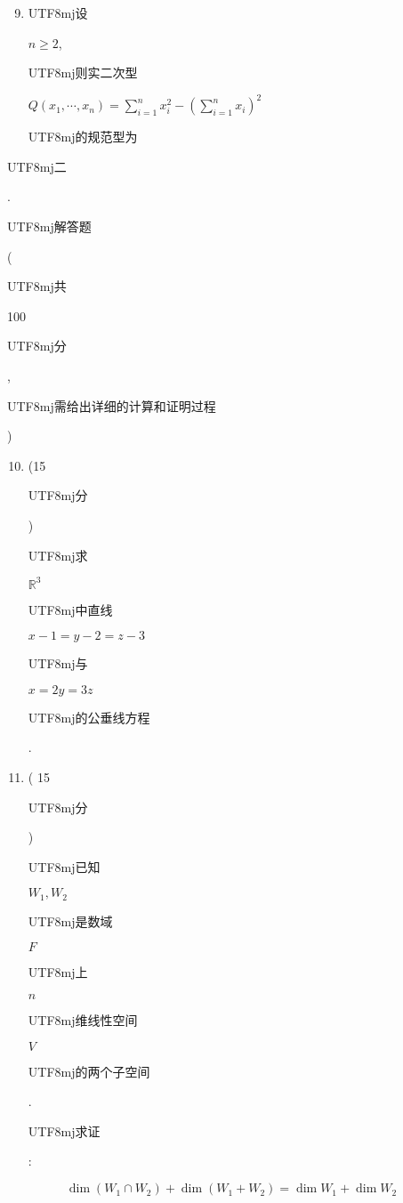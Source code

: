 \documentclass[10pt]{article}
\begin{document}
\begin{enumerate}
  \setcounter{enumi}{8}
  \item \begin{CJK}{UTF8}{mj}设\end{CJK} $n \geqslant 2$, \begin{CJK}{UTF8}{mj}则实二次型\end{CJK} $Q\left(x_{1}, \cdots, x_{n}\right)=\sum_{i=1}^{n} x_{i}^{2}-\left(\sum_{i=1}^{n} x_{i}\right)^{2}$ \begin{CJK}{UTF8}{mj}的规范型为\end{CJK}
\end{enumerate}
\begin{CJK}{UTF8}{mj}二\end{CJK}. \begin{CJK}{UTF8}{mj}解答题\end{CJK}(\begin{CJK}{UTF8}{mj}共\end{CJK} 100 \begin{CJK}{UTF8}{mj}分\end{CJK}, \begin{CJK}{UTF8}{mj}需给出详细的计算和证明过程\end{CJK})

\begin{enumerate}
  \setcounter{enumi}{9}
  \item (15 \begin{CJK}{UTF8}{mj}分\end{CJK}) \begin{CJK}{UTF8}{mj}求\end{CJK} $\mathbb{R}^{3}$ \begin{CJK}{UTF8}{mj}中直线\end{CJK} $x-1=y-2=z-3$ \begin{CJK}{UTF8}{mj}与\end{CJK} $x=2 y=3 z$ \begin{CJK}{UTF8}{mj}的公垂线方程\end{CJK}.

  \item ( 15 \begin{CJK}{UTF8}{mj}分\end{CJK}) \begin{CJK}{UTF8}{mj}已知\end{CJK} $W_{1}, W_{2}$ \begin{CJK}{UTF8}{mj}是数域\end{CJK} $F$ \begin{CJK}{UTF8}{mj}上\end{CJK} $n$ \begin{CJK}{UTF8}{mj}维线性空间\end{CJK} $V$ \begin{CJK}{UTF8}{mj}的两个子空间\end{CJK}. \begin{CJK}{UTF8}{mj}求证\end{CJK}:

\end{enumerate}
$$
\operatorname{dim}\left(W_{1} \cap W_{2}\right)+\operatorname{dim}\left(W_{1}+W_{2}\right)=\operatorname{dim} W_{1}+\operatorname{dim} W_{2}
$$
\end{document}
